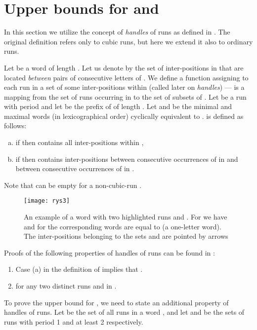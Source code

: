 \documentclass{llncs}
\begin{document}
  \section{Upper bounds for  and }
    In this section we utilize the concept of \emph{handles} of runs as
    defined in \cite{Lata10}.
    The original definition refers only to cubic runs, but here we extend it also to ordinary runs.

    Let  be a word of length .
    Let us denote by  the set of inter-positions in  
    that are located \emph{between} pairs of consecutive letters of .
    We define a function  assigning to each run  in  
    a set of some inter-positions within  (called later on \emph{handles}) --- 
     is a mapping from the set of runs occurring in  to the set  of subsets of .
    Let  be a run with period  and let  be the prefix of  of length .
    Let  and  be the minimal and maximal words (in lexicographical order)
    cyclically equivalent to .
     is defined as follows:
    \begin{enumerate}[a)]
      \item
      if  then  contains all inter-positions
      within ,
      \item
      if  then  contains inter-positions between
      consecutive occurrences of  in  and between consecutive
      occurrences of  in .
    \end{enumerate}
    Note that  can be empty for a non-cubic-run .

    \begin{figure}[th]
    \begin{center}
      \texttt{[image: rys3]}
      \caption{\label{f:handles_ex}
          An example of a word with two highlighted runs  and .
          For  we have  and for 
          the corresponding words are equal to  (a one-letter word).
          The inter-positions belonging to the sets  and 
          are pointed by arrows
      }
    \end{center}
    \end{figure}

    Proofs of the following properties of handles of runs can be found in \cite{Lata10}:
    \begin{enumerate}
      \item Case (a) in the definition of  implies that .
      \item  for any two distinct runs  and  in .
    \end{enumerate}

    To prove the upper bound for , we need to state an additional property of
    handles of runs.
    Let  be the set of all runs in a word , and let
     and  be the sets of runs with period
    1 and at least 2 respectively.
\end{document}
